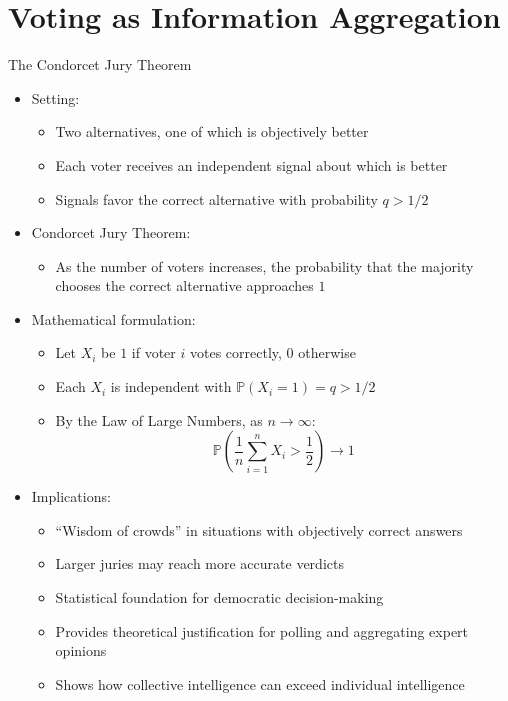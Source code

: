 \documentclass[10pt,handout]{beamer}
\begin{document}
\section{Voting as Information Aggregation}

\begin{frame}{The Condorcet Jury Theorem}
  \begin{itemize}[<+->]
    \item Setting: 
      \begin{itemize}
        \item Two alternatives, one of which is objectively better
        \item Each voter receives an independent signal about which is better
        \item Signals favor the correct alternative with probability $q > 1/2$
      \end{itemize}
    \item Condorcet Jury Theorem:
      \begin{itemize}
        \item As the number of voters increases, the probability that the majority chooses the correct alternative approaches $1$
      \end{itemize}
    \item Mathematical formulation:
      \begin{itemize}
        \item Let $X_i$ be $1$ if voter $i$ votes correctly, $0$ otherwise
        \item Each $X_i$ is independent with $\mathbb{P}(X_i = 1) = q > 1/2$
        \item By the Law of Large Numbers, as $n\to\infty$:
          \[\mathbb{P}\left(\frac{1}{n}\sum_{i=1}^n X_i > \frac{1}{2}\right) \to 1\]
          \vspace{-5mm}
      \end{itemize}
    \item Implications:
      \begin{itemize}
        \item ``Wisdom of crowds'' in situations with objectively correct answers
        \item Larger juries may reach more accurate verdicts
        \item Statistical foundation for democratic decision-making
        \item Provides theoretical justification for polling and aggregating expert opinions
        \item Shows how collective intelligence can exceed individual intelligence
      \end{itemize}
  \end{itemize}
\end{frame}
\end{document}
